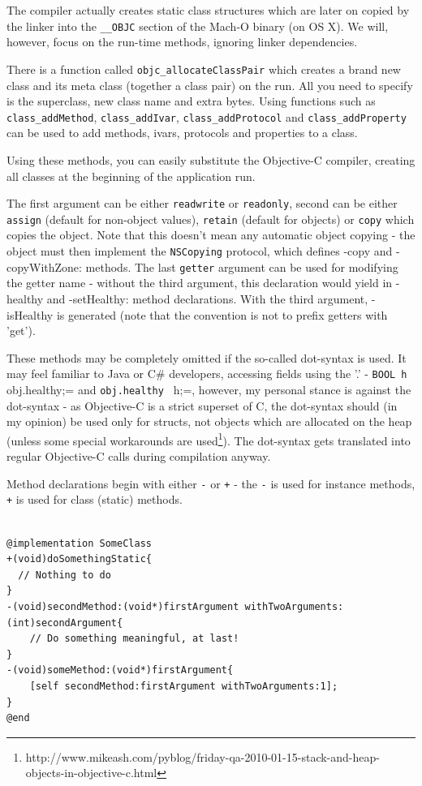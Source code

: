 \documentclass[a4paper, 11pt, fleqn]{book}
\begin{document}
The compiler actually creates static class structures which are later on copied by the linker into the \verb=__OBJC= section of the Mach-O binary (on OS X). We will, however, focus on the run-time methods, ignoring linker dependencies.

There is a function called \verb=objc_allocateClassPair= which creates a brand new class and its meta class (together a class pair) on the run. All you need to specify is the superclass, new class name and extra bytes. Using functions such as \verb=class_addMethod=, \verb=class_addIvar=, \verb=class_addProtocol= and \verb=class_addProperty= can be used to add methods, ivars, protocols and properties to a class.

Using these methods, you can easily substitute the Objective-C compiler, creating all classes at the beginning of the application run. 



The first argument can be either \verb=readwrite= or \verb=readonly=, second can be either \verb=assign= (default for non-object values), \verb=retain= (default for objects) or \verb=copy= which copies the object. Note that this doesn't mean any automatic object copying - the object must then implement the \verb=NSCopying= protocol, which defines -copy and -copyWithZone: methods. The last \verb=getter= argument can be used for modifying the getter name - without the third argument, this declaration would yield in -healthy and -setHealthy: method declarations. With the third argument, -isHealthy is generated (note that the convention is not to prefix getters with 'get'). 

These methods may be completely omitted if the so-called dot-syntax is used. It may feel familiar to Java or C# developers, accessing fields using the '.' - \verb=BOOL h = obj.healthy;= and \verb=obj.healthy = h;=, however, my personal stance is against the dot-syntax - as Objective-C is a strict superset of C, the dot-syntax should (in my opinion) be used only for structs, not objects which are allocated on the heap (unless some special workarounds are used\footnote{http://www.mikeash.com/pyblog/friday-qa-2010-01-15-stack-and-heap-objects-in-objective-c.html}). The dot-syntax gets translated into regular Objective-C calls during compilation anyway.

Method declarations begin with either \verb=-= or \verb=+= - the \verb=-= is used for instance methods, \verb=+= is used for class (static) methods.


\begin{verbatim}

@implementation SomeClass
+(void)doSomethingStatic{
  // Nothing to do
}
-(void)secondMethod:(void*)firstArgument withTwoArguments:(int)secondArgument{
    // Do something meaningful, at last!
}
-(void)someMethod:(void*)firstArgument{
    [self secondMethod:firstArgument withTwoArguments:1];
}
@end

\end{verbatim}
\end{document}
